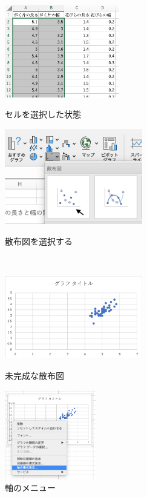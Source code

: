 \begin{figure}[tb]
    \begin{minipage}{0.5\hsize}
        \centering
        \includegraphics[width=5cm]{chap2/scatter_data.png}
        \caption{セルを選択した状態}
        \label{fig:scatter_data}
    \end{minipage}
 \begin{minipage}{0.5\hsize}
        \centering
        \includegraphics[width=6cm]{chap2/scatter_menu.png}
        \caption{散布図を選択する}
        \label{fig:scatter_menu}
    \end{minipage}
    \\
    \begin{minipage}{0.5\hsize}
        \centering
        \includegraphics[width=6cm]{chap2/scatter1.png}
        \caption{未完成な散布図}
        \label{fig:scatter1}
    \end{minipage}
    \begin{minipage}{0.5\hsize}
        \centering
        \includegraphics[width=4cm]{chap2/scatter_axis.png}
        \caption{軸のメニュー}
        \label{fig:scatter_axis}
    \end{minipage}
\end{figure}

